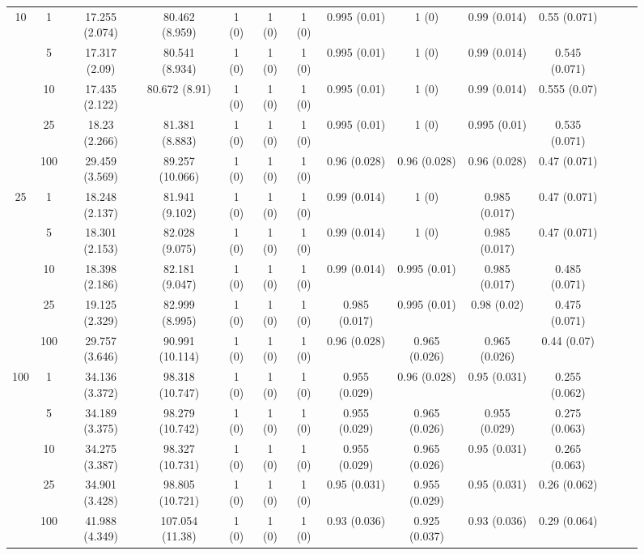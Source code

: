 \documentclass[10pt]{article}
\theoremstyle{definition}
\begin{document}
\begin{sidewaysfigure}
\begin{tabular}{cc|cc|ccc|ccc|ccc|c}
  \multirow{5}{*}{10} & 1 & 17.255 (2.074) & 80.462 (8.959) & 1 (0) & 1 (0) & 1 (0) & 0.995 (0.01) & 1 (0) & 0.99 (0.014) & 0.55 (0.071) \\ 
  & 5 & 17.317 (2.09) & 80.541 (8.934) & 1 (0) & 1 (0) & 1 (0) & 0.995 (0.01) & 1 (0) & 0.99 (0.014) & 0.545 (0.071) \\ 
 & 10 & 17.435 (2.122) & 80.672 (8.91) & 1 (0) & 1 (0) & 1 (0) & 0.995 (0.01) & 1 (0) & 0.99 (0.014) & 0.555 (0.07) \\ 
    & 25 & 18.23 (2.266) & 81.381 (8.883) & 1 (0) & 1 (0) & 1 (0) & 0.995 (0.01) & 1 (0) & 0.995 (0.01) & 0.535 (0.071) \\ 
    & 100 & 29.459 (3.569) & 89.257 (10.066) & 1 (0) & 1 (0) & 1 (0) & 0.96 (0.028) & 0.96 (0.028) & 0.96 (0.028) & 0.47 (0.071) \\[.3cm]  
    \multirow{5}{*}{25} & 1 & 18.248 (2.137) & 81.941 (9.102) & 1 (0) & 1 (0) & 1 (0) & 0.99 (0.014) & 1 (0) & 0.985 (0.017) & 0.47 (0.071) \\ 
   & 5 & 18.301 (2.153) & 82.028 (9.075) & 1 (0) & 1 (0) & 1 (0) & 0.99 (0.014) & 1 (0) & 0.985 (0.017) & 0.47 (0.071) \\ 
   & 10 & 18.398 (2.186) & 82.181 (9.047) & 1 (0) & 1 (0) & 1 (0) & 0.99 (0.014) & 0.995 (0.01) & 0.985 (0.017) & 0.485 (0.071) \\ 
 & 25 & 19.125 (2.329) & 82.999 (8.995) & 1 (0) & 1 (0) & 1 (0) & 0.985 (0.017) & 0.995 (0.01) & 0.98 (0.02) & 0.475 (0.071) \\ 
 & 100 & 29.757 (3.646) & 90.991 (10.114) & 1 (0) & 1 (0) & 1 (0) & 0.96 (0.028) & 0.965 (0.026) & 0.965 (0.026) & 0.44 (0.07) \\[.3cm]  
  \multirow{5}{*}{100} & 1 & 34.136 (3.372) & 98.318 (10.747) & 1 (0) & 1 (0) & 1 (0) & 0.955 (0.029) & 0.96 (0.028) & 0.95 (0.031) & 0.255 (0.062) \\ 
  & 5 & 34.189 (3.375) & 98.279 (10.742) & 1 (0) & 1 (0) & 1 (0) & 0.955 (0.029) & 0.965 (0.026) & 0.955 (0.029) & 0.275 (0.063) \\ 
  & 10 & 34.275 (3.387) & 98.327 (10.731) & 1 (0) & 1 (0) & 1 (0) & 0.955 (0.029) & 0.965 (0.026) & 0.95 (0.031) & 0.265 (0.063) \\ 
  & 25 & 34.901 (3.428) & 98.805 (10.721) & 1 (0) & 1 (0) & 1 (0) & 0.95 (0.031) & 0.955 (0.029) & 0.95 (0.031) & 0.26 (0.062) \\ 
  & 100 & 41.988 (4.349) & 107.054 (11.38) & 1 (0) & 1 (0) & 1 (0) & 0.93 (0.036) & 0.925 (0.037) & 0.93 (0.036) & 0.29 (0.064) \\ 
\end{tabular}
\end{sidewaysfigure}
\end{document}
